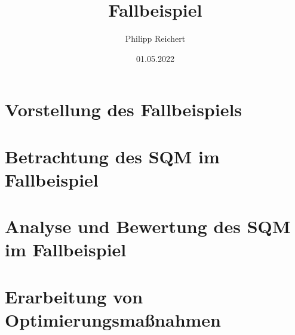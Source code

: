 \documentclass[12pt]{article}
\begin{document}
\title{Fallbeispiel}
\date{01.05.2022}
\author{Philipp Reichert}

\maketitle

\section{Vorstellung des Fallbeispiels}

\section{Betrachtung des SQM im Fallbeispiel}

\section{Analyse und Bewertung des SQM im Fallbeispiel}

\section{Erarbeitung von Optimierungsmaßnahmen}
\end{document}

